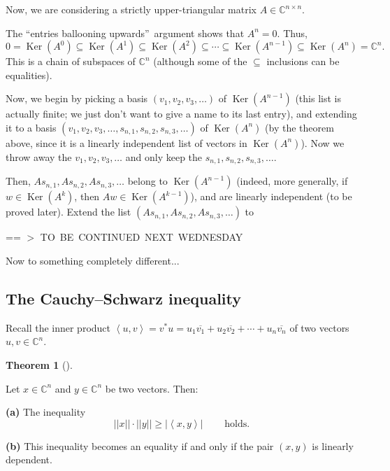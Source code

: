 \documentclass[numbers=enddot,12pt,final,onecolumn,notitlepage]{scrartcl}%
\numberwithin{exer}{subsection}
\theoremstyle{definition}
\newtheorem{theo}{Theorem}[subsection]
\newenvironment{theorem}[1][]
{\begin{theo}[#1]\begin{leftbar}}
{\end{leftbar}\end{theo}}
\begin{document}
Now, we are considering a strictly upper-triangular matrix $A\in
\mathbb{C}^{n\times n}$.

The \textquotedblleft entries ballooning upwards\textquotedblright\ argument
shows that $A^{n}=0$. Thus,%
\[
0=\operatorname*{Ker}\left(  A^{0}\right)  \subseteq\operatorname*{Ker}\left(
A^{1}\right)  \subseteq\operatorname*{Ker}\left(  A^{2}\right)  \subseteq
\cdots\subseteq\operatorname*{Ker}\left(  A^{n-1}\right)  \subseteq
\operatorname*{Ker}\left(  A^{n}\right)  =\mathbb{C}^{n}.
\]
This is a chain of subspaces of $\mathbb{C}^{n}$ (although some of the
$\subseteq$ inclusions can be equalities).

Now, we begin by picking a basis $\left(  v_{1},v_{2},v_{3},\ldots\right)  $
of $\operatorname*{Ker}\left(  A^{n-1}\right)  $ (this list is actually
finite; we just don't want to give a name to its last entry), and extending it
to a basis $\left(  v_{1},v_{2},v_{3},\ldots,s_{n,1},s_{n,2},s_{n,3}%
,\ldots\right)  $ of $\operatorname*{Ker}\left(  A^{n}\right)  $ (by the
theorem above, since it is a linearly independent list of vectors in
$\operatorname*{Ker}\left(  A^{n}\right)  $). Now we throw away the
$v_{1},v_{2},v_{3},\ldots$ and only keep the $s_{n,1},s_{n,2},s_{n,3},\ldots$.

Then, $As_{n,1},As_{n,2},As_{n,3},\ldots$ belong to $\operatorname*{Ker}%
\left(  A^{n-1}\right)  $ (indeed, more generally, if $w\in\operatorname*{Ker}%
\left(  A^{k}\right)  $, then $Aw\in\operatorname*{Ker}\left(  A^{k-1}\right)
$), and are linearly independent (to be proved later). Extend the list
$\left(  As_{n,1},As_{n,2},As_{n,3},\ldots\right)  $ to 

==%
$>$
TO\ BE\ CONTINUED\ NEXT\ WEDNESDAY

\bigskip

Now to something completely different...

\subsection{The Cauchy--Schwarz inequality}

Recall the inner product $\left\langle u,v\right\rangle =v^{\ast}%
u=u_{1}\overline{v_{1}}+u_{2}\overline{v_{2}}+\cdots+u_{n}\overline{v_{n}}$ of
two vectors $u,v\in\mathbb{C}^{n}$.

\begin{theorem}
[Cauchy--Schwarz inequality]Let $x\in\mathbb{C}^{n}$ and $y\in\mathbb{C}^{n}$
be two vectors. Then:

\textbf{(a)} The inequality%
\[
\left\vert \left\vert x\right\vert \right\vert \cdot\left\vert \left\vert
y\right\vert \right\vert \geq\left\vert \left\langle x,y\right\rangle
\right\vert \ \ \ \ \ \ \ \ \ \ \text{holds.}%
\]


\textbf{(b)} This inequality becomes an equality if and only if the pair
$\left(  x,y\right)  $ is linearly dependent.
\end{theorem}
\end{document}
